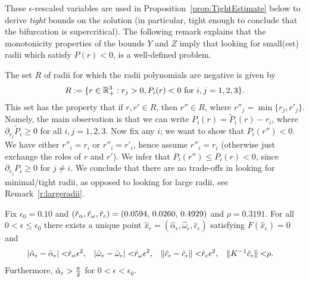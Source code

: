

These $\epsilon$-rescaled variables are used in
Proposition~\ref{prop:TightEstimate} below to derive \emph{tight} bounds on the
solution (in particular, tight enough to conclude that the bifurcation is
supercritical). The following remark explains that the monotonicity properties of
the bounds $Y$ and $Z$ imply that looking for small(est) radii which satisfy $P(r)<0$, is
a well-defined problem.


\begin{remark}\label{r:smallradii}
The set $R$ of radii for which the radii polynomials are negative is given by 
\[
  R := \{ r \in \mathbb{R}^3_+ : r_j > 0,  P_i(r) < 0 \text{ for } i,j=1,2,3 \} .
\] 
This set has the property that if
	$r,r' \in R$, then $r''\in R$, where $r''_j=\min\{ r_j,r'_j\}$.
Namely, the main observation is that we can write 
	$P_i(r)= \tilde{P}_i(r)-r_i$, where $\partial_{r_j} \tilde{P}_i \geq 0$ for all $i,j=1,2,3$.
Now fix any $i$; we want to show that $P_i(r'') < 0$.	
We have either $r''_i=r_i$ or $r''_i=r'_i$, hence assume $r''_i=r_i$ (otherwise
just exchange the roles of $r$ and $r'$). We infer that $P_i(r'') \leq P_i(r) <
0$, since $\partial_{r_j} P_i \geq 0$ for $j \neq i$.
We conclude that there are no trade-offs in looking for minimal/tight radii, as
opposed to looking for large radii, see Remark~\ref{r:largeradii}.
\end{remark}



\begin{proposition}
		\label{prop:TightEstimate}
	Fix $ \epsilon_0 = 0.10$ and 
$ (\check{r}_\alpha , \check{r}_ \omega , \check{r}_c) = (  0.0594, \, 0.0260 , \, 0.4929 ) $ 
and 
$\rho = 0.3191$. 
	For all $0< \epsilon \leq \epsilon_0$ there exists a unique point $\hat{x}_\epsilon = (\hat{\alpha}_\epsilon,\hat{\omega}_\epsilon,\hat{c}_\epsilon)$ 
	satisfying $F(\hat{x}_\epsilon) = 0$ and 
	\begin{align}
	\label{eq:TightBound}
 | \hat{\alpha}_\epsilon - \bar{\alpha}_\epsilon| <& \check{r}_\alpha \epsilon^2 , 
 &|\hat{\omega}_\epsilon - \bar{\omega}_\epsilon| <&  \check{r}_\omega \epsilon^2 ,
 &
 \| \hat{c}_\epsilon - \bar{c}_\epsilon\| <& \check{r}_c  \epsilon^2   ,
  &
  \| K^{-1} \hat{c}_\epsilon \| <& \rho  .
	\end{align}
Furthermore, $\hat{\alpha}_\epsilon > \tfrac{\pi}{2}$ for $ 0 < \epsilon < \epsilon_0$.
\end{proposition}

